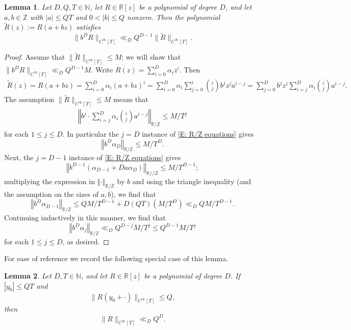 \documentclass[11pt]{amsart}
\newtheorem{lemma}{Lemma}[section]
\theoremstyle{definition}
\newcommand{\N}{{\mathbb N}}
\newcommand{\R}{{\mathbb R}}
\newcommand{\Z}{{\mathbb Z}}
\newcommand{\norm}[1]{\left\Vert #1\right\Vert}
\begin{document}
\begin{lemma}\label{extrapolation}
    Let $D, Q, T\in\N$, let $R\in\R[z]$ be a polynomial of degree $D$, and let $a, b \in \Z$ with $|a| \le QT$ and $0<|b| \leq Q$ nonzero. Then the polynomial $\tilde{R}(z):= R(a + bz)$ satisfies %
    $$\|b^D R\|_{C^\infty[T]} \ll_D Q^{D-1}\|\tilde{R}\|_{C^\infty[T]}.$$
\end{lemma}
\begin{proof}
Assume that $\|\tilde{R}\|_{C^\infty[T]} \le M$; we will show that $\|b^D R\|_{C^\infty[T]} \ll_D Q^{D-1} M$.  Write $R(z) = \sum_{i = 0}^D \alpha_i z^i$. Then
    \begin{align*}
        \tilde R(z)=R(a + bz) = \sum_{i = 0}^D \alpha_i (a + bz)^i = \sum_{i = 0}^D \alpha_i \sum_{j = 0}^i {i \choose j} b^jz^{j} a^{i - j} = \sum_{j =0}^D b^jz^{j} \sum_{i=j}^D \alpha_i {i \choose j} a^{i - j}.    
    \end{align*}
     The assumption $\|\tilde{R}\|_{C^\infty[T]} \le M$ means that
     \begin{align}\label{E: R/Z equations}
         \norm{b^j\cdot \sum_{i=j}^D  \alpha_i {i \choose j} a^{i - j}}_{\mathbb{R}/\mathbb{Z}} \le M/T^{j}
     \end{align}
    for each $1 \leq j \leq D$.  In particular the $j=D$ instance of \eqref{E: R/Z equations} gives $$\norm{b^D \alpha_D}_{\R/\Z} \leq M/T^D.$$
    Next, the $j=D-1$ instance of \eqref{E: R/Z equations} gives $$\norm{b^{D-1}(\alpha_{D-1}+Da\alpha_D)}_{\R//Z} \leq M/T^{D-1};$$
    multiplying the expression in $\norm{\cdot}_{\R/\Z}$ by $b$ and using the triangle inequality (and the assumption on the sizes of $a,b$), we find that
    $$\norm{b^D \alpha_{D-1}}_{\R/\Z} \leq QM/T^{D-1}+D(QT)(M/T^D) \ll_D QM/T^{D-1}.$$
    Continuing inductively in this manner, we find that
    $$\norm{b^D \alpha_{j}}_{\R/\Z} \ll_D Q^{D-j}M/T^j \leq Q^{D-1}M/T^j$$
    for each $1 \leq j \leq D$, as desired.
\end{proof}

For ease of reference we record the following special case of this lemma.

\begin{lemma}\label{translationextrapolation}
Let $D, T\in\N$, and let $R\in\R[z]$ be a polynomial of degree $D$. If $|y_0| \le QT$ and
$$\|R(y_0 + \cdot)\|_{C^\infty[T]} \le Q,$$
then
$$\|R\|_{C^\infty[T]} \ll_D Q^{D}.$$
\end{lemma}
\end{document}
